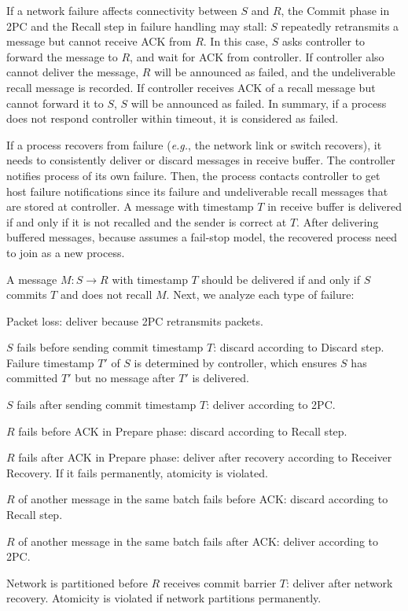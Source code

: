  If a network failure affects connectivity between $S$ and $R$, the Commit phase in 2PC and the Recall step in failure handling may stall: $S$ repeatedly retransmits a message but cannot receive ACK from $R$. In this case, $S$ asks controller to forward the message to $R$, and wait for ACK from controller. If controller also cannot deliver the message, $R$ will be announced as failed, and the undeliverable recall message is recorded. If controller receives ACK of a recall message but cannot forward it to $S$, $S$ will be announced as failed. In summary, if a process does not respond controller within timeout, it is considered as failed.

 If a process recovers from failure (\emph{e.g.}, the network link or switch recovers), it needs to consistently deliver or discard messages in receive buffer. The controller notifies process of its own failure. Then, the process contacts controller to get host failure notifications since its failure and undeliverable recall messages that are stored at controller. A message with timestamp $T$ in receive buffer is delivered if and only if it is not recalled and the sender is correct at $T$. After delivering buffered messages, because \sys{} assumes a fail-stop model, the recovered process need to join \sys{} as a new process.

A message $M: S \rightarrow R$ with timestamp $T$ should be delivered if and only if $S$ commits $T$ and does not recall $M$. Next, we analyze each type of failure:
\begin{ecompact}
\item Packet loss: deliver because 2PC retransmits packets.
\item $S$ fails before sending commit timestamp $T$: discard according to Discard step. Failure timestamp $T'$ of $S$ is determined by controller, which ensures $S$ has committed $T'$ but no message after $T'$ is delivered.
\item $S$ fails after sending commit timestamp $T$: deliver according to 2PC.
\item $R$ fails before ACK in Prepare phase: discard according to Recall step.
\item $R$ fails after ACK in Prepare phase: deliver after recovery according to Receiver Recovery. If it fails permanently, atomicity is violated.
\item $R$ of another message in the same batch fails before ACK: discard according to Recall step.
\item $R$ of another message in the same batch fails after ACK: deliver according to 2PC.
\item Network is partitioned before $R$ receives commit barrier $T$: deliver after network recovery. Atomicity is violated if network partitions permanently.
\end{ecompact}

